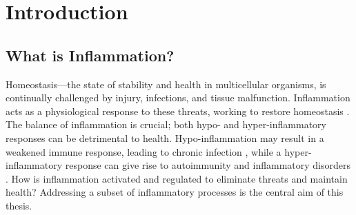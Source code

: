 \fancyhead[RE]{} %

\fancyhead[LO]{} %
\fancyhead[RO]{{\footnotesize {\rightmark}}\quad\thepage}



\mygeometry
\part{Introduction}
\restoregeometry
\chapter{What is Inflammation?}
\label{chapter:inflammation}
Homeostasis---the state of stability and health in multicellular organisms, is continually challenged by injury, infections, and tissue malfunction. Inflammation acts as a physiological response to these threats, working to restore homeostasis \autocite{Medzhitov_2008}. The balance of inflammation is crucial; both hypo- and hyper-inflammatory responses can be detrimental to health. Hypo-inflammation may result in a weakened immune response, leading to chronic infection \autocite{Tsirigotis_2016}, while a hyper-inflammatory response can give rise to autoimmunity and inflammatory disorders \autocite{Cavalli_2021}. How is inflammation activated and regulated to eliminate threats and maintain health? Addressing a subset of inflammatory processes is the central aim of this thesis.

